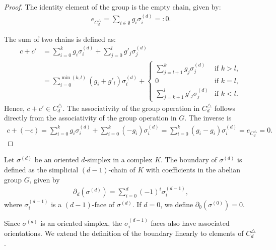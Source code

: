 \begin{proof}
	The identity element of the group is the empty chain, given by:
	\begin{align}
		e_{C^{\triangle}_d} = \sum_{i \in \emptyset} g_{i} \sigma_{i}^{(d)} =: 0. 
	\end{align}
				
	The sum of two chains is defined as:
	\begin{align}
		c + c' &= \sum_{i=0}^{k} g_{i} \sigma_{i}^{(d)} + \sum_{j=0}^{l} g'_{j} \sigma_{j}^{(d)} \\
			   &= \sum_{i=0}^{\min(k, l)} (g_{i} + g'_{i}) \sigma_{i}^{(d)} + 
				\begin{cases}
				\sum_{j=l+1}^{k} g_{j} \sigma_{j}^{(d)}  & \text{if } k > l, \\
				0                                                          & \text{if } k = l, \\
				\sum_{j=k+1}^{l} g'_{j} \sigma_{j}^{(d)} & \text{if } k < l. 
				\end{cases}
	\end{align}
	Hence, \( c + c' \in C^{\triangle}_{d} \). The associativity of the group operation in \( C^{\triangle}_{d} \) follows directly from
	the associativity of the group operation in \( G \). The inverse is
	\begin{align}
		c + (-c) = \sum_{i=0}^{k} g_{i} \sigma_{i}^{(d)} + \sum_{i=0}^{k} (-g_{i}) \sigma_{i}^{(d)} = \sum_{i=0}^{k} (g_{i} - g_{i}) \sigma_{i}^{(d)} = e_{C^{\triangle}_d} = 0. 
	\end{align}
\end{proof}

\begin{definition}[Boundary]{\cite[\S 2, p.106]{hatcher2005algebraic}} 
	Let \( \sigma^{(d)} \) be an oriented \( d \)-simplex in a complex \( K \). The boundary of \( \sigma^{(d)} \) is defined as the simplicial \( (d-1) \)-chain of \( K \) with coefficients in the abelian group \( G \), given by
	\begin{align}
		\partial_d(\sigma^{(d)}) = \sum_{i=0}^{d} (-1)^{i} \sigma^{(d-1)}_{i}, 
	\end{align}
	where \( \sigma^{(d-1)}_{i} \) is a \( (d-1) \)-face of \( \sigma^{(d)} \). If \( d = 0 \), we define \( \partial_0(\sigma^{(0)}) = 0 \).
\end{definition}

Since \( \sigma^{(d)} \) is an oriented simplex, the \( \sigma^{(d-1)}_{i} \) faces also have associated orientations. We extend the definition of the boundary linearly to elements of \( C^{\triangle}_{d} \).

